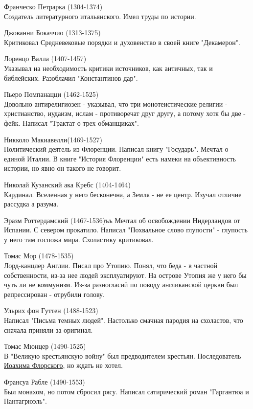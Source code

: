 \documentclass[12pt,a4paper]{article}
\begin{document}
Франческо Петрарка (1304-1374)\\
Создатель литературного итальянского. Имел труды по истории.

Джованни Бокаччио (1313-1375)\\ 
Критиковал Средневековые порядки и духовенство в своей книге "Декамерон". 

Лоренцо Валла (1407-1457)\\
Указывал на необходимость критики источников, как античных, так и библейских. Разоблачил "Константинов дар".

Пьеро Помпанацци (1462-1525)\\
Довольно антирелигиозен - указывал, что три монотеистические религии - христианство, иудаизм, ислам - противоречат друг другу, а потому хотя бы две -  фейк. Написал "Трактат о трех обманщиках".

Никколо Макиавелли(1469-1527)\\
Политический деятель из Флоренции. Написал книгу "Государь". Мечтал о единой Италии. В книге "История Флоренции" есть намеки на объективность истории, но явно он такого не говорит.

Николай Кузанский ака Кребс (1404-1464)\\
Кардинал. Вселенная у него бесконечна, а Земля - не ее центр. Изучал отличие рассудка а разума.

Эразм Роттердамский (1467-1536)ъъ
Мечтал об освобождении Нидерландов от Испании. С севером прокатило. Написал "Похвальное слово глупости" - глупость у него там госпожа мира. Схоластику критиковал.

Томас Мор (1478-1535)\\
Лорд-канцлер Англии. Писал про Утопию. Понял, что беда - в частной собственности, из-за нее людей эксплуатируют. На острове Утопия же у него бы чуть ли не коммунизм. Из-за разногласий по поводу англиканской церкви был репрессирован - отрубили голову.

Ульрих фон Гуттен (1488-1523)\\
Написал "Письма темных людей". Настолько смачная пародия на схоластов, что сначала приняли за оригинал.

Томас Мюнцер (1490-1525)\\
В "Великую крестьянскую войну" был предводителем крестьян. Последователь \underline{Иоахима Флорского}, но ждать не хотел.

Франсуа Рабле (1490-1553)\\
Был монахом, но потом сбросил рясу. Написал сатирический роман "Гаргантюа и Пантагрюэль".
\end{document}
